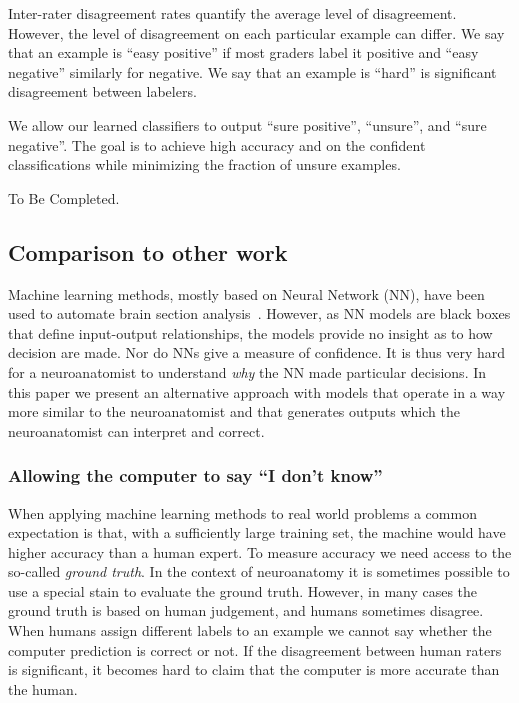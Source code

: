 \documentclass[11pt]{article}
\begin{document}
Inter-rater disagreement rates quantify the average level of
disagreement. However, the level of disagreement on each particular
example can differ. We say that an example is ``easy positive'' if
most graders label it positive and ``easy negative'' similarly for
negative. We say that an example is ``hard'' is significant
disagreement between labelers.

We allow our learned classifiers to output ``sure positive'',
``unsure'', and ``sure negative''. The goal is to achieve high accuracy and
on the confident classifications while minimizing the fraction of unsure examples.

To Be Completed.

\subsection{Comparison to other work}
Machine learning methods, mostly based on Neural Network (NN), have
been used to automate brain section analysis~\cite{}. However, as NN
models are black boxes that define input-output relationships, the
models provide no insight as to how decision are made. Nor do NNs give
a measure of confidence. It is thus very hard for a neuroanatomist to
understand {\em why} the NN made particular decisions. In this paper
we present an alternative approach with models that operate in a way
more similar to the neuroanatomist and that generates outputs which
the neuroanatomist can interpret and correct.





\iffalse
\subsubsection{Allowing the computer to say ``I don't know''}

When applying machine learning methods to real world problems a common 
expectation is that, with a sufficiently large training set, the
machine would have higher accuracy than a human expert. To measure
accuracy we need access to the so-called {\em ground truth}. In the
context of neuroanatomy it is sometimes possible to use a special
stain to evaluate the ground truth. However, in many cases the ground
truth is based on human judgement, and humans sometimes disagree. When
humans assign different labels to an example we cannot say whether the
computer prediction is correct or not. If the disagreement between
human raters is significant, it becomes hard to claim that the
computer is more accurate than the human.
\end{document}
